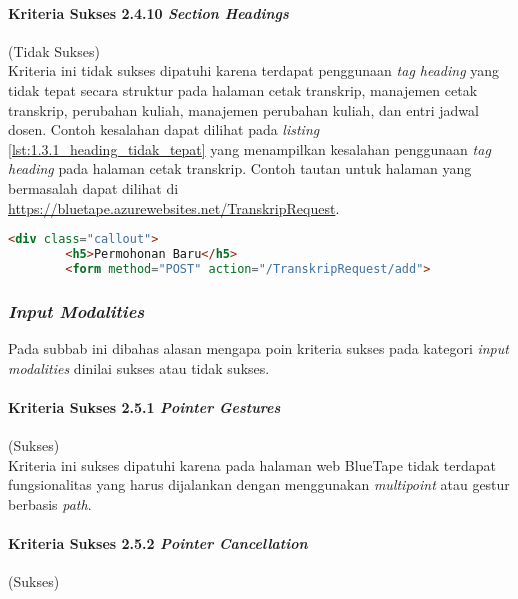 \paragraph{Kriteria Sukses 2.4.10 \textit{Section Headings}}
\label{par:kepatuhan_bluetape_kriteria_sukses_2.4.10}
(Tidak Sukses)\\

Kriteria ini tidak sukses dipatuhi karena terdapat penggunaan \textit{tag heading} yang tidak tepat secara struktur pada halaman cetak transkrip, manajemen cetak transkrip, perubahan kuliah, manajemen perubahan kuliah, dan entri jadwal dosen. Contoh kesalahan dapat dilihat pada \textit{listing} \ref{lst:1.3.1_heading_tidak_tepat} yang menampilkan kesalahan penggunaan \textit{tag heading} pada halaman cetak transkrip. Contoh tautan untuk halaman yang bermasalah dapat dilihat di \url{https://bluetape.azurewebsites.net/TranskripRequest}.

\begin{lstlisting}[frame=single, label={lst:2.4.10_heading_tidak_tepat}, language=HTML, caption=Pelanggaran Kriteria Sukses 2.4.10 pada Halaman Cetak Transkrip]
    <div class="callout">
        <h5>Permohonan Baru</h5>
        <form method="POST" action="/TranskripRequest/add">
\end{lstlisting}

\subsubsection{\textit{Input Modalities}}
\label{subsubsec:kepatuhan_bluetape_input_modalities}
Pada subbab ini dibahas alasan mengapa poin kriteria sukses pada kategori \textit{input modalities} dinilai sukses atau tidak sukses.

\paragraph{Kriteria Sukses 2.5.1 \textit{Pointer Gestures}}
\label{par:kepatuhan_bluetape_kriteria_sukses_2.5.1}
(Sukses)\\

Kriteria ini sukses dipatuhi karena pada halaman web BlueTape tidak terdapat fungsionalitas yang harus dijalankan dengan menggunakan \textit{multipoint} atau gestur berbasis \textit{path}.

\paragraph{Kriteria Sukses 2.5.2 \textit{Pointer Cancellation}}
\label{par:kepatuhan_bluetape_kriteria_sukses_2.5.2}
(Sukses)\\

